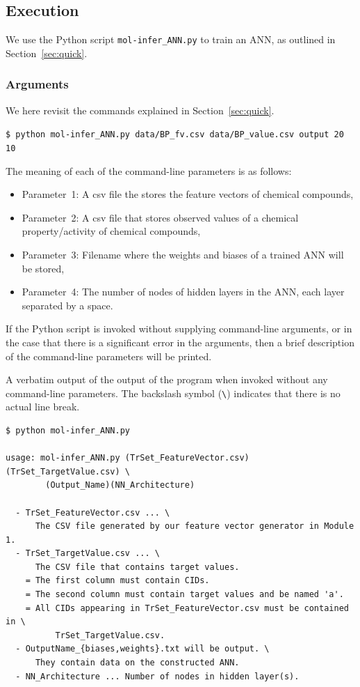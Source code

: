 \documentclass[11pt, titlepage, dvipdfmx, twoside]{article}
\newcommand{\secref}[1]{Section~\ref{sec:#1}}
\begin{document}
  
\subsection{Execution}

We use the Python script {\tt mol-infer\_ANN.py}
to train an ANN, as outlined in \secref{quick}.


\subsubsection{Arguments}
We here revisit the commands 
explained in \secref{quick}.
\begin{oframed}
{\small
\verb|$ python mol-infer_ANN.py data/BP_fv.csv data/BP_value.csv output 20 10|
}
\end{oframed}
The meaning of each of the command-line parameters is as follows:
\begin{itemize}
\item Parameter~1: 
  A csv file the stores the feature vectors of chemical compounds,
  
\item Parameter~2: 
  A csv file that stores observed values of a chemical property/activity of chemical compounds,
  
\item Parameter~3: 
Filename where the weights and biases of a trained ANN will be stored,

\item Parameter~4: 
The number of nodes of hidden layers in the ANN, each layer separated by a space.
\end{itemize}

If the Python script is invoked without supplying command-line arguments,
or in the case that there is a significant error in the arguments,
then a brief description of the command-line parameters will be printed.
\begin{oframed}
A verbatim output of the output of the program when invoked without any command-line parameters. The backslash symbol (\verb|\|) indicates that there is no actual line break. 
  {\small
\begin{verbatim}
$ python mol-infer_ANN.py 

usage: mol-infer_ANN.py (TrSet_FeatureVector.csv)(TrSet_TargetValue.csv) \
	    (Output_Name)(NN_Architecture)
                  
  - TrSet_FeatureVector.csv ... \
      The CSV file generated by our feature vector generator in Module 1.
  - TrSet_TargetValue.csv ... \
      The CSV file that contains target values.
    = The first column must contain CIDs.
    = The second column must contain target values and be named 'a'. 
    = All CIDs appearing in TrSet_FeatureVector.csv must be contained in \
	      TrSet_TargetValue.csv. 
  - OutputName_{biases,weights}.txt will be output. \
      They contain data on the constructed ANN. 
  - NN_Architecture ... Number of nodes in hidden layer(s).
\end{verbatim}
  }
  \end{oframed}
\end{document}
